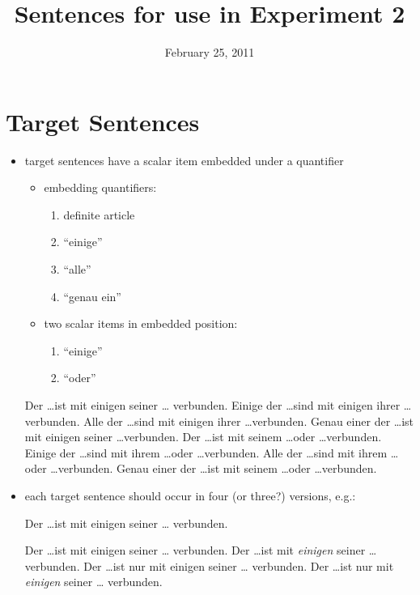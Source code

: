 \documentclass[fleqn,reqno,10pt]{article}
\title{Sentences for use in Experiment 2}
\date{February 25, 2011 }
\begin{document}
\maketitle

\section{Target Sentences}

\begin{itemize}
\item target sentences have a scalar item embedded under a quantifier
  \begin{itemize}
  \item embedding quantifiers:
    \begin{enumerate}
    \item definite article 
    \item ``einige'' 
    \item ``alle'' 
    \item ``genau ein'' 
    \end{enumerate}
  \item two scalar items in embedded position:
    \begin{enumerate}
    \item ``einige''
    \item ``oder''
    \end{enumerate}
  \end{itemize}
  \begin{exe}
  \ex \label{bsp:target1} Der \dots ist mit einigen seiner \dots
    verbunden. \attrib{($\iota\exists$)}
  \ex Einige der \dots sind  mit einigen ihrer \dots
    verbunden. \attrib{($\exists\exists$)}
  \ex Alle der \dots sind  mit einigen ihrer \dots verbunden. \attrib{($\forall\exists$)}
  \ex Genau einer der \dots ist  mit einigen seiner \dots verbunden. \attrib{($!\exists\exists$)}
  \ex Der \dots ist mit seinem \dots oder \dots verbunden. \attrib{($\iota\vee$)}
  \ex Einige der \dots sind  mit ihrem \dots oder \dots verbunden. \attrib{($\exists\vee$)}
  \ex Alle der \dots sind  mit ihrem \dots oder \dots verbunden. \attrib{($\forall\vee$)}
  \ex Genau einer der \dots ist  mit seinem \dots oder \dots verbunden. \attrib{($!\exists\vee$)}
  \end{exe}
\item each target sentence should occur in four (or three?) versions,
  e.g.:
  \begin{exe}
   Der \dots ist mit einigen seiner \dots
    verbunden. \attrib{($\iota\exists$)}
    \begin{xlist}
    \ex Der \dots ist mit einigen seiner \dots
      verbunden. 
    \ex Der \dots ist mit \emph{einigen} seiner \dots
      verbunden. 
    \ex Der \dots ist nur mit einigen seiner \dots
      verbunden. 
    \ex Der \dots ist nur mit \emph{einigen} seiner \dots
      verbunden. 
    \end{xlist}
  \end{exe}

\end{itemize}
\end{document}
